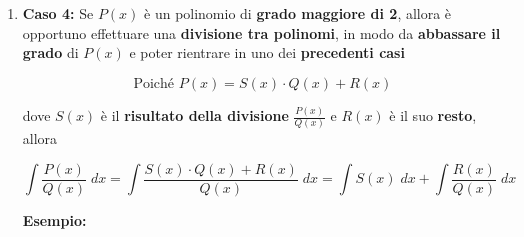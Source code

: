 \documentclass[a4paper, 12pt]{report}
\begin{document}
\begin{enumerate}
\begin{enumerate}
\begin{itemize}
                \end{itemize}
            \end{enumerate}
            
            \newpage
            
            \item \textbf{Caso 4:} Se $P(x)$ è un polinomio di \textbf{grado maggiore di 2}, allora è opportuno effettuare una \textbf{divisione tra polinomi}, in modo da \textbf{abbassare il grado} di $P(x)$ e poter rientrare in uno dei \textbf{precedenti casi}
            
            \[ \text{Poiché } P(x) = S(x) \cdot Q(x)+R(x)\]
            
            dove $S(x)$ è il \textbf{risultato della divisione} $\frac{P(x)}{Q(x)}$ e $R(x)$ è il suo \textbf{resto}, allora
            
            \[ \int \frac{P(x)}{Q(x)} \; dx = \int \frac{S(x) \cdot Q(x) + R(x)}{Q(x)} \; dx = \int S(x) \; dx + \int \frac{R(x)}{Q(x)} \; dx\]
            
            \textbf{Esempio:}
\end{enumerate}
\end{document}
